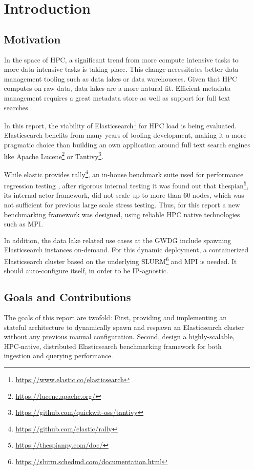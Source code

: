 \section{Introduction}
\subsection{Motivation}
In the space of \ac{HPC}, a significant trend from more compute intensive tasks to more data intensive tasks is taking place. This change necessitates better data-management tooling such as data lakes or data warehoueses. Given that \ac{HPC} computes on raw data, data lakes are a more natural fit. Efficient metadata management requires a great metadata store as well as support for full text searches.

In this report, the viability of Elasticsearch\footnote{\url{https://www.elastic.co/elasticsearch}} for \ac{HPC} load is being evaluated. Elasticsearch benefits from many years of tooling development, making it a more pragmatic choice than building an own application around full text search engines like Apache Lucene\footnote{\url{https://lucene.apache.org/}} or Tantivy\footnote{\url{https://github.com/quickwit-oss/tantivy}}.

While elastic provides rally\footnote{\url{https://github.com/elastic/rally}}, an in-house benchmark suite used for performance regression testing \cite{es_benchmarking}, after rigorous internal testing it was found out that thespian\footnote{\url{https://thespianpy.com/doc/}}, its internal actor framework, did not scale up to more than 60 nodes, which was not sufficient for previous large scale stress testing. Thus, for this report a new benchmarking framework was designed, using reliable \ac{HPC} native technologies such as \ac{MPI}.

In addition, the data lake related use cases at the GWDG include spawning Elasticsearch instances on-demand. For this dynamic deployment, a containerized Elasticsearch cluster based on the underlying \ac{SLURM}\footnote{\url{https://slurm.schedmd.com/documentation.html}} and \ac{MPI} is needed. It should auto-configure itself, in order to be IP-agnostic.
\subsection{Goals and Contributions}
The goals of this report are twofold: First, providing and implementing an stateful architecture to dynamically spawn and respawn an Elasticsearch cluster without any previous manual configuration. Second, design a highly-scalable, \ac{HPC}-native, distributed Elasticsearch benchmarking framework for both ingestion and querying performance. 

